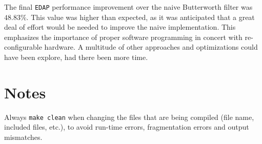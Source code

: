 \documentclass[letterpaper, 10 pt, conference]{ieeeconf}  %
\begin{document}
The final \texttt{EDAP} performance improvement over the naive Butterworth filter was $48.83\%$. This value was higher than expected, as it was anticipated that a great deal of effort would be needed to improve the naive implementation. This emphasizes the importance of proper software programming in concert with re-configurable hardware. A multitude of other approaches and optimizations could have been explore, had there been more time. 















\section{Notes}
Always \texttt{make clean} when changing the files that are being compiled (file name, included files, etc.), to avoid run-time errors, fragmentation errors and output mismatches.

\addtolength{\textheight}{-12cm}   %







%
%
%
\end{document}
